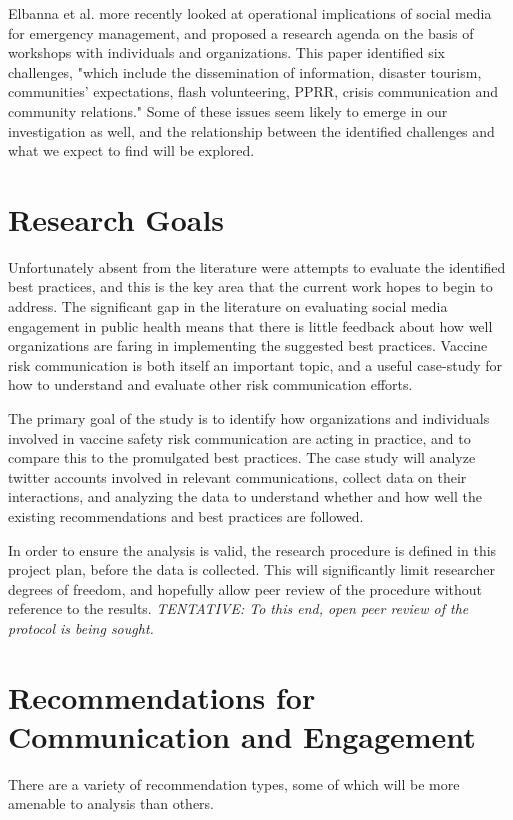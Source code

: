\documentclass{article}
\begin{document}
Elbanna et al. more recently looked at operational implications of social media for emergency management, and proposed a research agenda on the basis of workshops with individuals and organizations. This paper identified six challenges, "which include the dissemination of information, disaster tourism, communities’ expectations, flash volunteering, PPRR, crisis communication and community relations." \cite{Elbanna2019} Some of these issues seem likely to emerge in our investigation as well, and the relationship between the identified challenges and what we expect to find will be explored.

\section{Research Goals}

Unfortunately absent from the literature were attempts to evaluate the identified best practices, and this is the key area that the current work hopes to begin to address. The significant gap in the literature on evaluating social media engagement in public health means that there is little feedback about how well organizations are faring in implementing the suggested best practices. Vaccine risk communication is both itself an important topic, and a useful case-study for how to understand and evaluate other risk communication efforts.

The primary goal of the study is to identify how organizations and individuals involved in vaccine safety risk communication are acting in practice, and to compare this to the promulgated best practices. The case study will analyze twitter accounts involved in relevant communications, collect data on their interactions, and analyzing the data to understand whether and how well the existing recommendations and best practices are followed. 

In order to ensure the analysis is valid, the research procedure is defined in this project plan, before the data is collected. This will significantly limit researcher degrees of freedom, and hopefully allow peer review of the procedure without reference to the results. \textit{TENTATIVE: To this end, open peer review of the protocol is being sought.}

\section{Recommendations for Communication and Engagement}

There are a variety of recommendation types, some of which will be more amenable to analysis than others.
\end{document}
